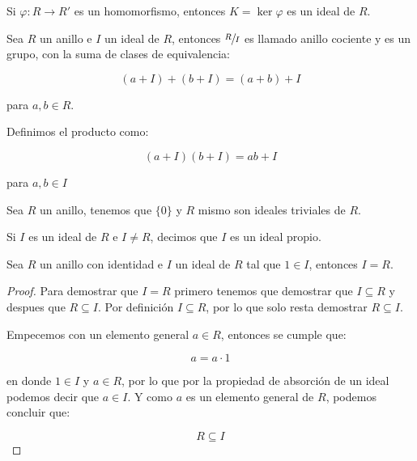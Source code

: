         \begin{corolario}
            Si $\varphi \colon R \to R'$ es un homomorfismo, entonces $K = \ker{\varphi}$ es un ideal de $R$.
        \end{corolario}

        \begin{definicion}
            Sea $R$ un anillo e $I$ un ideal de $R$, entonces $\sfrac{R}{I}$ es llamado anillo cociente y es un grupo, con la suma de clases de equivalencia:

            \begin{equation}
                (a + I) + (b + I) = (a + b) + I
            \end{equation}

            para $a, b \in R$.
        \end{definicion}

        \begin{definicion}
            Definimos el producto como:

            \begin{equation}
                (a + I)(b + I) = ab + I
            \end{equation}

            para $a, b \in I$
        \end{definicion}

        \begin{observacion}
            Sea $R$ un anillo, tenemos que $\{0\}$ y $R$ mismo son ideales triviales de $R$.
        \end{observacion}

        \begin{definicion}
            Si $I$ es un ideal de $R$ e $I \ne R$, decimos que $I$ es un ideal propio.
        \end{definicion}

        \begin{proposicion}
            Sea $R$ un anillo con identidad e $I$ un ideal de $R$ tal que $1 \in I$, entonces $I = R$.
        \end{proposicion}

        \begin{proof}
            Para demostrar que $I = R$ primero tenemos que demostrar que $I \subseteq R$ y despues que $R \subseteq I$.
            Por definición $I \subseteq R$, por lo que solo resta demostrar $R \subseteq I$.

            Empecemos con un elemento general $a \in R$, entonces se cumple que:

            \begin{equation*}
                a = a \cdot 1
            \end{equation*}

            en donde $1 \in I$ y $a \in R$, por lo que por la propiedad de absorción de un ideal podemos decir que $a \in I$.
            Y como $a$ es un elemento general de $R$, podemos concluir que:

            \begin{equation*}
                R \subseteq I
            \end{equation*}
        \end{proof}

